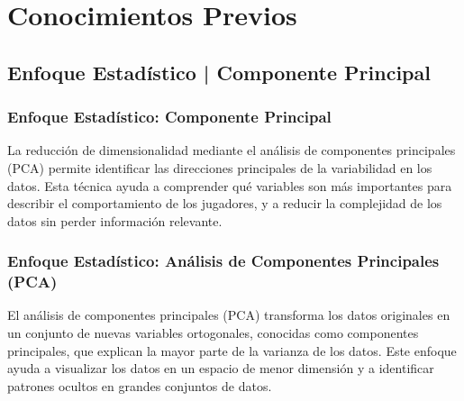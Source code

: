 \documentclass[11pt]{beamer}
\begin{document}
	\section{Conocimientos Previos}
    \begin{frame}
        \subsection{Enfoque Estadístico | Componente Principal}
        \frametitle{Enfoque Estadístico: Componente Principal}
        La reducción de dimensionalidad mediante el análisis de componentes principales (PCA) permite identificar las direcciones principales de la variabilidad en los datos. Esta técnica ayuda a comprender qué variables son más importantes para describir el comportamiento de los jugadores, y a reducir la complejidad de los datos sin perder información relevante.
        \end{frame}
	
		\begin{frame}
            \frametitle{Enfoque Estadístico: Análisis de Componentes Principales (PCA)}
            El análisis de componentes principales (PCA) transforma los datos originales en un conjunto de nuevas variables ortogonales, conocidas como componentes principales, que explican la mayor parte de la varianza de los datos. Este enfoque ayuda a visualizar los datos en un espacio de menor dimensión y a identificar patrones ocultos en grandes conjuntos de datos.
            \end{frame}
\end{document}
